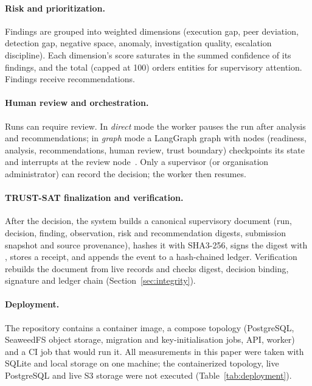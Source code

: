 \paragraph{Risk and prioritization.}
Findings are grouped into  weighted dimensions (execution gap,
peer deviation, detection gap, negative space, anomaly, investigation quality,
escalation discipline). Each dimension's score saturates in the summed
confidence of its findings, and the total (capped at 100) orders entities for
supervisory attention. Findings receive recommendations.

\paragraph{Human review and orchestration.}
Runs can require review. In \emph{direct} mode the worker pauses the run after
analysis and recommendations; in \emph{graph} mode a LangGraph graph with
 nodes (readiness, analysis, recommendations, human review,
trust boundary) checkpoints its state and interrupts at the review node~\cite{langgraph2026docs}.
Only a supervisor (or organisation administrator) can record the decision; the worker then
resumes.

\paragraph{TRUST-SAT finalization and verification.}
After the decision, the system builds a canonical supervisory document
(run, decision, finding, observation, risk and recommendation digests, submission
snapshot and source provenance), hashes it with SHA3-256, signs the digest with
, stores a receipt, and appends the event to a hash-chained
ledger. Verification rebuilds the document from live records and checks digest,
decision binding, signature and ledger chain (Section~\ref{sec:integrity}).

\paragraph{Deployment.}
The repository contains a container image, a compose topology (PostgreSQL,
SeaweedFS object storage, migration and key-initialisation jobs, API, worker) and a
CI job that would run it. All measurements in this paper were taken with SQLite and
local storage on one machine; the containerized topology, live PostgreSQL and live
S3 storage were not executed (Table~\ref{tab:deployment}).

